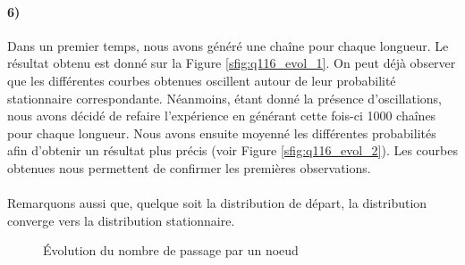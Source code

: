 \documentclass[a4paper,titlepage]{report}
\begin{document}
\paragraph{6)} Dans un premier temps, nous avons généré une chaîne pour chaque longueur. Le résultat obtenu est donné sur la Figure \ref{sfig:q116_evol_1}. On peut déjà observer que les différentes courbes obtenues oscillent autour de leur probabilité stationnaire correspondante. Néanmoins, étant donné la présence d'oscillations, nous avons décidé de refaire l'expérience en générant cette fois-ci 1000 chaînes pour chaque longueur. Nous avons ensuite moyenné les différentes probabilités afin d'obtenir un résultat plus précis (voir Figure \ref{sfig:q116_evol_2}). Les courbes obtenues nous permettent de confirmer les premières observations.
\paragraph{}
Remarquons aussi que, quelque soit la distribution de départ, la distribution converge vers la distribution stationnaire.
\begin{figure}[h]
	\center
	\caption{Évolution du nombre de passage par un noeud}
\end{figure}
\end{document}
